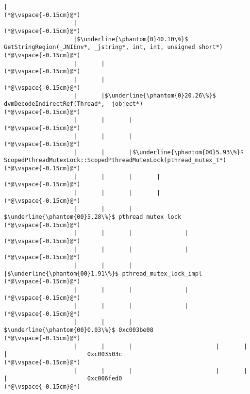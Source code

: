 \begin{lstlisting}[caption=Unicode-merkkijonon kopiointi C$\to$Java, label=profile:C2JCopyUnicode-512, numberbychapter=true, frame=lines, float, floatplacement=t]
                    |
(*@\vspace{-0.15cm}@*)
                    |
(*@\vspace{-0.15cm}@*)
                    |$\underline{\phantom{0}40.10\%}$ GetStringRegion(_JNIEnv*, _jstring*, int, int, unsigned short*)
(*@\vspace{-0.15cm}@*)
                    |       |
(*@\vspace{-0.15cm}@*)
                    |       |
(*@\vspace{-0.15cm}@*)
                    |       |$\underline{\phantom{0}20.26\%}$ dvmDecodeIndirectRef(Thread*, _jobject*)
(*@\vspace{-0.15cm}@*)
                    |       |       |
(*@\vspace{-0.15cm}@*)
                    |       |       |
(*@\vspace{-0.15cm}@*)
                    |       |       |$\underline{\phantom{00}5.93\%}$ ScopedPthreadMutexLock::ScopedPthreadMutexLock(pthread_mutex_t*)
(*@\vspace{-0.15cm}@*)
                    |       |       |       |
(*@\vspace{-0.15cm}@*)
                    |       |       |       |
(*@\vspace{-0.15cm}@*)
                    |       |       |        $\underline{\phantom{00}5.28\%}$ pthread_mutex_lock
(*@\vspace{-0.15cm}@*)
                    |       |       |               |
(*@\vspace{-0.15cm}@*)
                    |       |       |               |
(*@\vspace{-0.15cm}@*)
                    |       |       |               |$\underline{\phantom{00}1.91\%}$ pthread_mutex_lock_impl
(*@\vspace{-0.15cm}@*)
                    |       |       |               |
(*@\vspace{-0.15cm}@*)
                    |       |       |               |
(*@\vspace{-0.15cm}@*)
                    |       |       |                $\underline{\phantom{00}0.03\%}$ 0xc003be08
(*@\vspace{-0.15cm}@*)
                    |       |       |                        |       |       |                       0xc003503c
(*@\vspace{-0.15cm}@*)
                    |       |       |                        |       |       |                       0xc006fed0
(*@\vspace{-0.15cm}@*)

\end{lstlisting}
